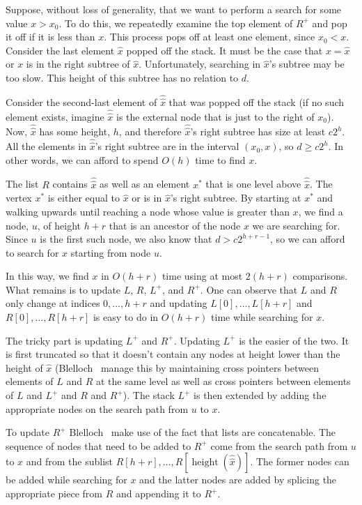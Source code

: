 \documentclass{patmorin}
\DeclareMathOperator{\hgt}{height}
\begin{document}
Suppose, without loss of generality, that we want to perform a search for
some value $x>x_0$.  To do this, we repeatedly examine the top element
of $R^+$ and pop it off if it is less than $x$.  This process pops off
at least one element, since $x_0<x$.  Consider the last element $\hat x$
popped off the stack.  It must be the case that $x=\hat x$ or $x$ is in
the right subtree of $\hat x$.  Unfortunately, searching in $\hat x$'s
subtree may be too slow.  This height of this subtree has no relation
to $d$.

Consider the second-last element of $\hat{\hat x}$ that was popped off
the stack (if no such element exists, imagine $\hat{\hat x}$ is the
external node that is just to the right of $x_0$).  Now, $\hat{\hat
x}$ has some height, $h$, and therefore $\hat{\hat x}$'s right subtree
has size at least $c2^h$.  All the elements in $\hat{\hat x}$'s right
subtree are in the interval $(x_0,x)$, so $d\ge c2^h$.  In other words,
we can afford to spend $O(h)$ time to find $x$.

The list $R$ contains $\hat{\hat x}$ as well as an element $x^*$ that is
one level above $\hat{\hat x}$.  The vertex $x^*$ is either equal to $\hat
x$ or is in $\hat x$'s right subtree.  By starting at $x^*$ and walking
upwards until reaching a node whose value is greater than $x$, we find
a node, $u$, of height $h+r$ that is an ancestor of the node $x$ we are
searching for.  Since $u$ is the first such node, we also know that $d >
c2^{h+r-1}$, so we can afford to search for $x$ starting from node $u$.

In this way, we find $x$ in $O(h+r)$ time using at most $2(h+r)$
comparisons.  What remains is to update $L$, $R$, $L^+$, and $R^+$.
One can observe that $L$ and $R$ only change at indices $0,\ldots,h+r$
and updating $L[0],\ldots,L[h+r]$ and $R[0],\ldots,R[h+r]$ is easy to
do in $O(h+r)$ time while searching for $x$.

The tricky part is updating $L^+$ and $R^+$.  Updating $L^+$ is the
easier of the two.  It is first truncated so that it doesn't contain
any nodes at height lower than the height of $\hat x$ (Blelloch \etal\
manage this by maintaining cross pointers between elements of $L$ and
$R$ at the same level as well as cross pointers between elements of $L$
and $L^+$ and $R$ and $R^+$). The stack $L^+$ is then extended by adding
the appropriate nodes on the search path from $u$ to $x$.

To update $R^+$ Blelloch \etal\ make use of the fact that lists
are concatenable. The sequence of nodes that need to be added to
$R^+$ come from the search path from $u$ to $x$ and from the sublist
$R[h+r],\ldots,R[\hgt(\hat{\hat{x}})]$.  The former nodes can be added
while searching for $x$ and the latter nodes are added by splicing the
appropriate piece from $R$ and appending it to $R^+$.
\end{document}
